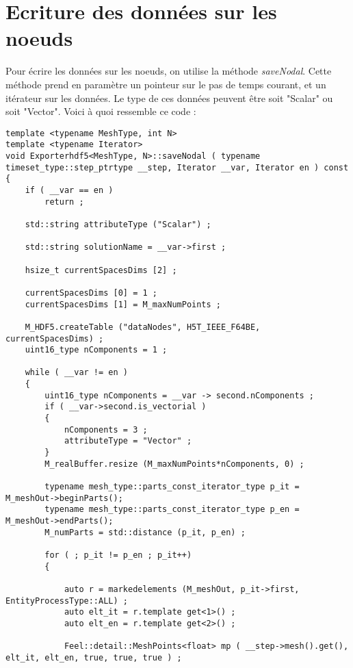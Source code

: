 \documentclass[10pt]{article}
\begin{document}
\section {Ecriture des données sur les noeuds}
Pour écrire les données sur les noeuds, on utilise la méthode \emph{saveNodal}. Cette méthode prend en paramètre un pointeur sur le pas de temps courant, et un itérateur sur les données. Le type de ces données peuvent être soit "Scalar" ou soit "Vector".
Voici à quoi ressemble ce code :
\begin{lstlisting}
template <typename MeshType, int N>
template <typename Iterator>
void Exporterhdf5<MeshType, N>::saveNodal ( typename timeset_type::step_ptrtype __step, Iterator __var, Iterator en ) const 
{   
    if ( __var == en )
        return ;

    std::string attributeType ("Scalar") ;

    std::string solutionName = __var->first ;

    hsize_t currentSpacesDims [2] ;

    currentSpacesDims [0] = 1 ;
    currentSpacesDims [1] = M_maxNumPoints ;

    M_HDF5.createTable ("dataNodes", H5T_IEEE_F64BE, currentSpacesDims) ;
    uint16_type nComponents = 1 ;

    while ( __var != en )
    {
        uint16_type nComponents = __var -> second.nComponents ;
        if ( __var->second.is_vectorial ) 
        {
            nComponents = 3 ;
            attributeType = "Vector" ;
        }
        M_realBuffer.resize (M_maxNumPoints*nComponents, 0) ;

        typename mesh_type::parts_const_iterator_type p_it = M_meshOut->beginParts();
        typename mesh_type::parts_const_iterator_type p_en = M_meshOut->endParts();
        M_numParts = std::distance (p_it, p_en) ;

        for ( ; p_it != p_en ; p_it++) 
        {

            auto r = markedelements (M_meshOut, p_it->first, EntityProcessType::ALL) ;
            auto elt_it = r.template get<1>() ;
            auto elt_en = r.template get<2>() ;

            Feel::detail::MeshPoints<float> mp ( __step->mesh().get(), elt_it, elt_en, true, true, true ) ;


\end{lstlisting}
\end{document}
